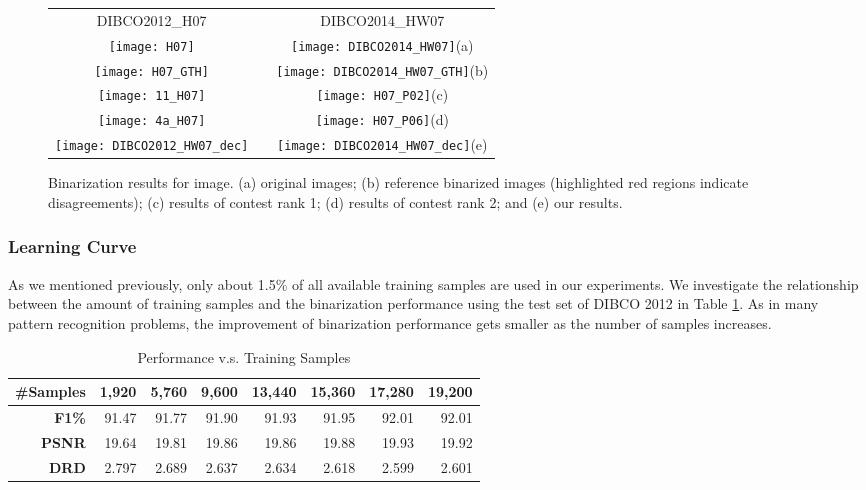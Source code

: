 \documentclass[onecolumn,11pt,draftcls,journal]{IEEEtran}
\def\fhIb{2.2cm}
\begin{document}
\begin{figure}[!h]
\centering\scriptsize
\begin{tabular}{@{}c@{}m{.05cm}@{}c@{}}{DIBCO2012\_H07}&&{DIBCO2014\_HW07}\\
\texttt{[image: H07]}&&\texttt{[image: DIBCO2014\_HW07]}{(a)}\\
\texttt{[image: H07\_GTH]}&&\texttt{[image: DIBCO2014\_HW07\_GTH]}{(b)}\\
\texttt{[image: 11\_H07]}&&\texttt{[image: H07\_P02]}{(c)}\\
\texttt{[image: 4a\_H07]}&&\texttt{[image: H07\_P06]}{(d)}\\
\texttt{[image: DIBCO2012\_HW07\_dec]}&&\texttt{[image: DIBCO2014\_HW07\_dec]}{(e)}
\end{tabular}
\caption{Binarization results for image. (a) original images; (b) reference binarized images (highlighted red regions indicate disagreements); (c) results of contest rank 1; (d) results of contest rank 2; and (e) our results.}
\label{fig.2014}
\end{figure}

\subsubsection{Learning Curve}
As we mentioned previously, only about 1.5\% of all available training samples are used in our experiments. We investigate the relationship between the amount of training samples and the binarization performance using the test set of DIBCO 2012 in Table \ref{tab.sample}.  As in many pattern recognition problems, the improvement of binarization performance gets smaller as the number of samples increases. 

\begin{table}[!h]
\centering\scriptsize
\caption{ Performance v.s. Training Samples }
\label{tab.sample}
\begin{tabular}{r|rrrrrrr}
\hline
\bf{\#Samples} &\bf{1,920} &\bf{5,760} &\bf{9,600} &\bf{13,440} &\bf{15,360} &\bf{17,280} &\bf{19,200} \\\hline
 \bf{F1}\% & 91.47 & 91.77 & 91.90 & 91.93 & 91.95 & 92.01 & 92.01 \\
 \bf{PSNR} & 19.64 & 19.81 & 19.86 & 19.86 & 19.88 & 19.93 & 19.92 \\
 \bf{DRD} & 2.797 & 2.689 & 2.637 & 2.634 & 2.618 & 2.599 & 2.601 \\
 \hline
\end{tabular}
\end{table}
\end{document}
